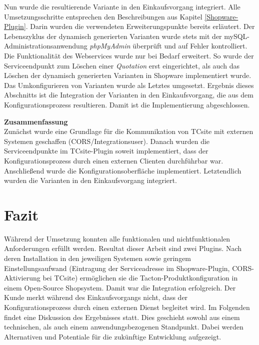 \documentclass[11pt, a4paper, titlepage, listof=totoc, bibliography=totoc, index=totoc, twoside, openright, headings=normal]{scrreprt}
\begin{document}
Nun wurde die resultierende Variante in den Einkaufsvorgang integriert. Alle  Umsetzungsschritte entsprechen den Beschreibungen aus Kapitel \ref{Shopware-Plugin}. Darin wurden die verwendeten Erweiterungspunkte bereits erläutert. Der Lebenszyklus der dynamisch generierten Varianten wurde stets mit der mySQL-Administrationsanwendung \emph{phpMyAdmin} überprüft und auf Fehler kontrolliert. Die Funktionalität des Webservices wurde nur bei Bedarf erweitert. So wurde der Serviceendpunkt zum Löschen einer \emph{Quotation} erst eingerichtet, als auch das Löschen der dynamisch generierten Varianten in Shopware implementiert wurde. Das Umkonfigurieren von Varianten wurde als Letztes umgesetzt. Ergebnis dieses Abschnitts ist die Integration der Varianten in den Einkaufsvorgang, die aus dem Konfigurationsprozess resultieren. Damit ist die Implementierung abgeschlossen.

\textbf{Zusammenfassung}\\
Zunächst wurde eine Grundlage für die Kommunikation von TCsite mit externen Systemen geschaffen (CORS/Integrationsuser). Danach wurden die Serviceendpunkte im TCsite-Plugin soweit implementiert, dass der Konfigurationsprozess durch einen externen Clienten durchführbar war. Anschließend wurde die Konfigurationsoberfläche implementiert. Letztendlich wurden die Varianten in den Einkaufsvorgang integriert.

\chapter{Fazit}
\label{Fazit}
Während der Umsetzung konnten alle funktionalen und nichtfunktionalen Anforderungen erfüllt werden. Resultat dieser Arbeit sind zwei Plugins. Nach deren Installation in den jeweiligen Systemen sowie geringem Einstellungsaufwand (Eintragung der Serviceadresse im Shopware-Plugin, CORS-Aktivierung bei TCsite) ermöglichen sie die Tacton-Produktkonfiguration in einem Open-Source Shopsystem. Damit war die Integration erfolgreich. Der Kunde merkt während des Einkaufsvorgangs nicht, dass der Konfigurationsprozess durch einen externen Dienst begleitet wird. Im Folgenden findet eine Diskussion des Ergebnisses statt. Dies geschieht sowohl aus einem technischen, als auch einem anwendungsbezogenen Standpunkt. Dabei werden Alternativen und Potentiale für die zukünftige Entwicklung aufgezeigt.
\end{document}
